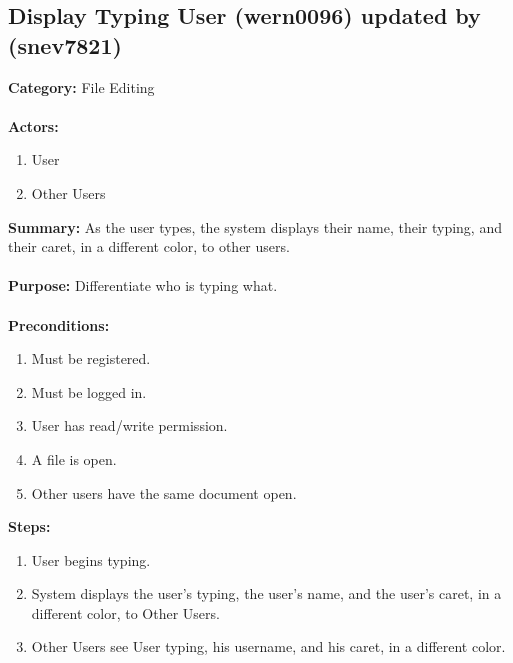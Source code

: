 \documentclass[11pt]{report}
\begin{document}
\subsection{Display Typing User (wern0096) updated by (snev7821)}
\begin{framed}

	\textbf{Category:} File Editing \\ \\
	\textbf{Actors:} 
	\begin{enumerate}
		\item User
		\item Other Users
	\end{enumerate}
	\textbf{Summary:} As the user types, the system displays their name, their typing, and their caret, in a different color, to other users. \\ \\
	\textbf{Purpose:} Differentiate who is typing what. \\ \\
	\textbf{Preconditions:} 
	\begin{enumerate}
		\item Must be registered.
		\item Must be logged in.
		\item User has read/write permission.
		\item A file is open.
		\item Other users have the same document open.
	\end{enumerate}
	\textbf{Steps:}
	\begin{enumerate}
		\item User begins typing.
		\item System displays the user's typing, the user's name, and the user's caret, in a different color, to Other Users.
		\item Other Users see User typing, his username, and his caret, in a different color.
	\end{enumerate}
\end{framed}

\newpage
\end{document}
